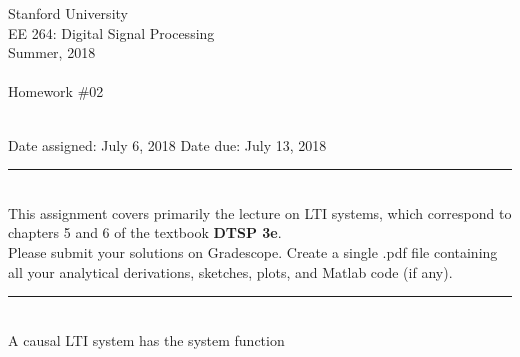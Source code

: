 \documentclass[12pt]{report}
\begin{document}
\thispagestyle{empty}
\begin{centering}
	{\large Stanford University}\\
	{\large EE 264: Digital Signal Processing}\\
	{\large Summer, 2018} \\
	\mbox{}\\
	{\large Homework \#02}\\
	\mbox{}\\
\end{centering}
\noindent Date assigned:  July 6, 2018 \hfill
Date due: July 13, 2018\\
\noindent \rule{6.5 in}{0.5pt}
\mbox{}\\ 
  This assignment covers primarily the lecture on LTI systems, which correspond to chapters 5 and 6 of the textbook {\bf DTSP 3e}. \\

  Please submit your solutions on Gradescope. Create a single .pdf file containing all your analytical derivations, sketches, plots, and Matlab code (if any). \\
\noindent
\rule{6.5 in}{0.5pt}
\mbox{}\\ 

A causal LTI system has the system function
\mbox{}\\ 
\end{document}
